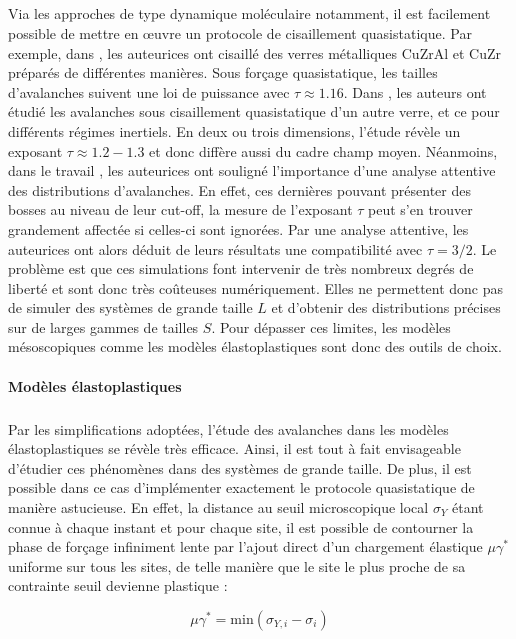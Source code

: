 \subparagraph{}Via les approches de type dynamique moléculaire notamment, il est facilement possible de mettre en œuvre un protocole de cisaillement quasistatique. Par exemple, dans \cite{makinen_avalanches_2025}, les auteurices ont cisaillé des verres métalliques CuZrAl et CuZr préparés de différentes manières. Sous forçage quasistatique, les tailles d'avalanches suivent une loi de puissance avec $\tau \approx 1.16$. Dans \cite{salerno_effect_2013}, les auteurs ont étudié les avalanches sous cisaillement quasistatique d'un autre verre, et ce pour différents régimes inertiels. En deux ou trois dimensions, l'étude révèle un exposant $\tau \approx 1.2-1.3$ et donc diffère aussi du cadre champ moyen. Néanmoins, dans le travail \cite{oyama_unified_2021}, les auteurices ont souligné l'importance d'une analyse attentive des distributions d'avalanches. En effet, ces dernières pouvant présenter des bosses au niveau de leur cut-off, la mesure de l'exposant $\tau$ peut s'en trouver grandement affectée si celles-ci sont ignorées. Par une analyse attentive, les auteurices ont alors déduit de leurs résultats une compatibilité avec $\tau=3/2$. Le problème est que ces simulations font intervenir de très nombreux degrés de liberté et sont donc très coûteuses numériquement. Elles ne permettent donc pas de simuler des systèmes de grande taille $L$ et d'obtenir des distributions précises sur de larges gammes de tailles $S$. Pour dépasser ces limites, les modèles mésoscopiques comme les modèles élastoplastiques sont donc des outils de choix.

\paragraph{Modèles élastoplastiques}

\subparagraph{}Par les simplifications adoptées, l'étude des avalanches dans les modèles élastoplastiques se révèle très efficace. Ainsi, il est tout à fait envisageable d'étudier ces phénomènes dans des systèmes de grande taille. De plus, il est possible dans ce cas d'implémenter exactement le protocole quasistatique de manière astucieuse. En effet, la distance au seuil microscopique local $\sigma_Y$ étant connue à chaque instant et pour chaque site, il est possible de contourner la phase de forçage infiniment lente par l'ajout direct d'un chargement élastique $\mu\gamma^*$ uniforme sur tous les sites, de telle manière que le site le plus proche de sa contrainte seuil devienne plastique :

\begin{equation}
	\mu\gamma^* = \mathrm{min}(\sigma_{Y,i}-\sigma_i)
\end{equation}

